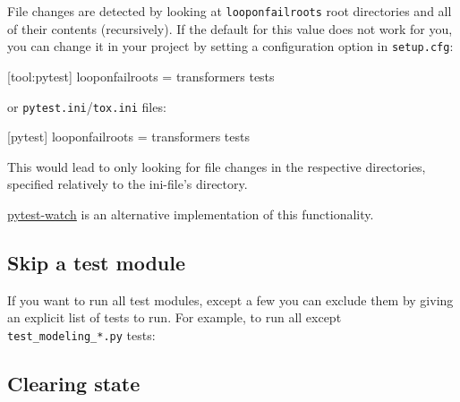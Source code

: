 \documentclass[
]{report}
\newenvironment{Shaded}{\begin{snugshade}}{\end{snugshade}}
\newcommand{\AttributeTok}[1]{\textcolor[rgb]{0.40,0.45,0.13}{#1}}
\newcommand{\DataTypeTok}[1]{\textcolor[rgb]{0.68,0.00,0.00}{#1}}
\newcommand{\ExtensionTok}[1]{\textcolor[rgb]{0.00,0.23,0.31}{#1}}
\newcommand{\FunctionTok}[1]{\textcolor[rgb]{0.28,0.35,0.67}{#1}}
\newcommand{\KeywordTok}[1]{\textcolor[rgb]{0.00,0.23,0.31}{#1}}
\newcommand{\NormalTok}[1]{\textcolor[rgb]{0.00,0.23,0.31}{#1}}
\newcommand{\OtherTok}[1]{\textcolor[rgb]{0.00,0.23,0.31}{#1}}
\newcommand{\PreprocessorTok}[1]{\textcolor[rgb]{0.68,0.00,0.00}{#1}}
\newcommand{\StringTok}[1]{\textcolor[rgb]{0.13,0.47,0.30}{#1}}
\newcommand{\VariableTok}[1]{\textcolor[rgb]{0.07,0.07,0.07}{#1}}
\begin{document}
File changes are detected by looking at \texttt{looponfailroots} root
directories and all of their contents (recursively). If the default for
this value does not work for you, you can change it in your project by
setting a configuration option in \texttt{setup.cfg}:

\begin{Shaded}
\begin{Highlighting}[]
\KeywordTok{[tool:pytest]}
\DataTypeTok{looponfailroots }\OtherTok{=}\StringTok{ transformers tests}
\end{Highlighting}
\end{Shaded}

or \texttt{pytest.ini}/\texttt{tox.ini} files:

\begin{Shaded}
\begin{Highlighting}[]
\KeywordTok{[pytest]}
\DataTypeTok{looponfailroots }\OtherTok{=}\StringTok{ transformers tests}
\end{Highlighting}
\end{Shaded}

This would lead to only looking for file changes in the respective
directories, specified relatively to the ini-file's directory.

\href{https://github.com/joeyespo/pytest-watch}{pytest-watch} is an
alternative implementation of this functionality.

\subsection{Skip a test module}\label{skip-a-test-module}

If you want to run all test modules, except a few you can exclude them
by giving an explicit list of tests to run. For example, to run all
except \texttt{test\_modeling\_*.py} tests:

\begin{Shaded}
\end{Shaded}

\subsection{Clearing state}\label{clearing-state}
\end{document}
